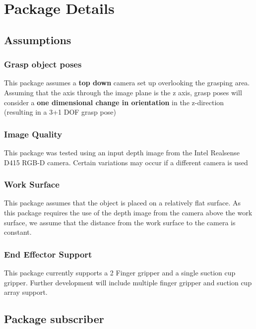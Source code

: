 \section*{Package Details}

\subsection*{Assumptions}

\subsubsection*{Grasp object poses}

This package assumes a {\bfseries top down} camera set up overlooking the grasping area. Assuming that the axis through the image plane is the z axis, grasp poses will consider a {\bfseries one dimensional change in orientation} in the z-\/direction (resulting in a 3+1 D\+OF grasp pose)

\subsubsection*{Image Quality}

This package was tested using an input depth image from the Intel Realsense D415 R\+G\+B-\/D camera. Certain variations may occur if a different camera is used

\subsubsection*{Work Surface}

This package assumes that the object is placed on a relatively flat surface. As this package requires the use of the depth image from the camera above the work surface, we assume that the distance from the work surface to the camera is constant.

\subsubsection*{End Effector Support}

This package currently supports a 2 Finger gripper and a single suction cup gripper. Further development will include multiple finger gripper and suction cup array support.

\subsection*{Package subscriber}

